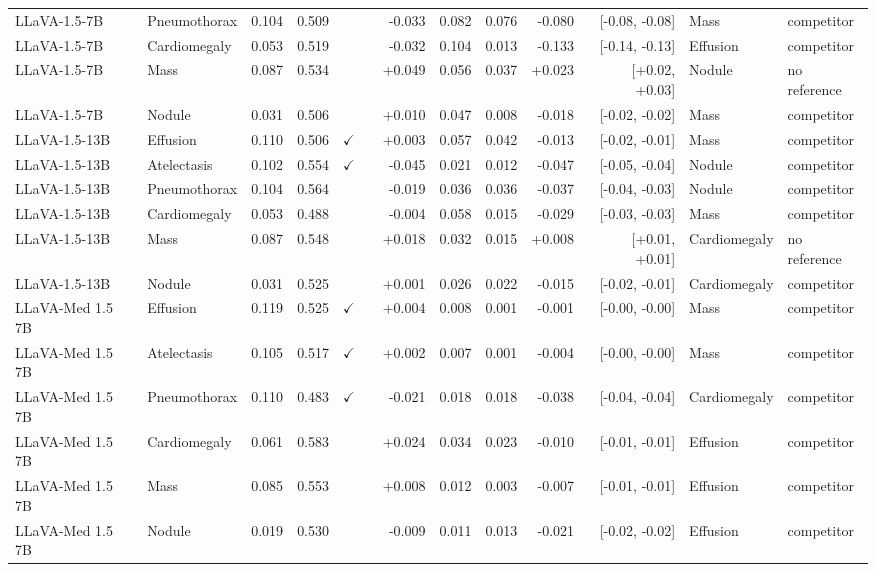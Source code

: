 \begin{longtable}{llrrccrrrrrll}
LLaVA-1.5-7B & Pneumothorax & 0.104 & 0.509 &  &  & -0.033 & 0.082 & 0.076 & -0.080 & [-0.08, -0.08] & Mass & competitor \\
LLaVA-1.5-7B & Cardiomegaly & 0.053 & 0.519 &  &  & -0.032 & 0.104 & 0.013 & -0.133 & [-0.14, -0.13] & Effusion & competitor \\
LLaVA-1.5-7B & Mass & 0.087 & 0.534 &  &  & +0.049 & 0.056 & 0.037 & +0.023 & [+0.02, +0.03] & Nodule & no reference \\
LLaVA-1.5-7B & Nodule & 0.031 & 0.506 &  &  & +0.010 & 0.047 & 0.008 & -0.018 & [-0.02, -0.02] & Mass & competitor \\
LLaVA-1.5-13B & Effusion & 0.110 & 0.506 & $\checkmark$ &  & +0.003 & 0.057 & 0.042 & -0.013 & [-0.02, -0.01] & Mass & competitor \\
LLaVA-1.5-13B & Atelectasis & 0.102 & 0.554 & $\checkmark$ &  & -0.045 & 0.021 & 0.012 & -0.047 & [-0.05, -0.04] & Nodule & competitor \\
LLaVA-1.5-13B & Pneumothorax & 0.104 & 0.564 &  &  & -0.019 & 0.036 & 0.036 & -0.037 & [-0.04, -0.03] & Nodule & competitor \\
LLaVA-1.5-13B & Cardiomegaly & 0.053 & 0.488 &  &  & -0.004 & 0.058 & 0.015 & -0.029 & [-0.03, -0.03] & Mass & competitor \\
LLaVA-1.5-13B & Mass & 0.087 & 0.548 &  &  & +0.018 & 0.032 & 0.015 & +0.008 & [+0.01, +0.01] & Cardiomegaly & no reference \\
LLaVA-1.5-13B & Nodule & 0.031 & 0.525 &  &  & +0.001 & 0.026 & 0.022 & -0.015 & [-0.02, -0.01] & Cardiomegaly & competitor \\
LLaVA-Med 1.5 7B & Effusion & 0.119 & 0.525 & $\checkmark$ &  & +0.004 & 0.008 & 0.001 & -0.001 & [-0.00, -0.00] & Mass & competitor \\
LLaVA-Med 1.5 7B & Atelectasis & 0.105 & 0.517 & $\checkmark$ &  & +0.002 & 0.007 & 0.001 & -0.004 & [-0.00, -0.00] & Mass & competitor \\
LLaVA-Med 1.5 7B & Pneumothorax & 0.110 & 0.483 & $\checkmark$ &  & -0.021 & 0.018 & 0.018 & -0.038 & [-0.04, -0.04] & Cardiomegaly & competitor \\
LLaVA-Med 1.5 7B & Cardiomegaly & 0.061 & 0.583 &  &  & +0.024 & 0.034 & 0.023 & -0.010 & [-0.01, -0.01] & Effusion & competitor \\
LLaVA-Med 1.5 7B & Mass & 0.085 & 0.553 &  &  & +0.008 & 0.012 & 0.003 & -0.007 & [-0.01, -0.01] & Effusion & competitor \\
LLaVA-Med 1.5 7B & Nodule & 0.019 & 0.530 &  &  & -0.009 & 0.011 & 0.013 & -0.021 & [-0.02, -0.02] & Effusion & competitor \\

\end{longtable}
